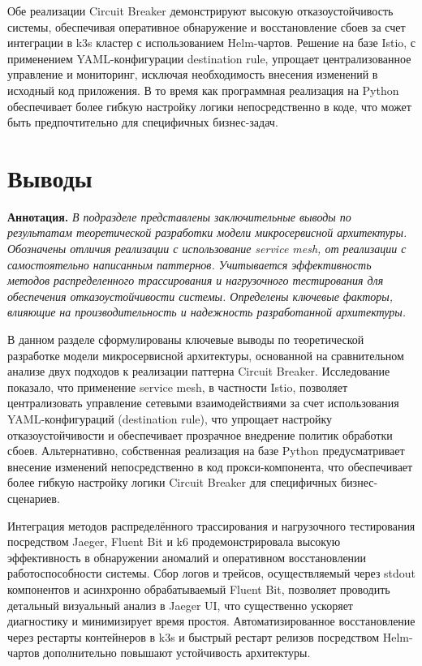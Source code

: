Обе реализации Circuit Breaker демонстрируют высокую отказоустойчивость системы, обеспечивая оперативное обнаружение и восстановление сбоев за счет интеграции в k3s кластер с использованием Helm-чартов. Решение на базе Istio, с применением YAML-конфигурации destination rule, упрощает централизованное управление и мониторинг, исключая необходимость внесения изменений в исходный код приложения. В то время как программная реализация на Python обеспечивает более гибкую настройку логики непосредственно в коде, что может быть предпочтительно для специфичных бизнес-задач.  

\section{Выводы}
  
\textbf{Аннотация.} \textit{В подразделе представлены заключительные выводы по результатам теоретической разработки модели микросервисной архитектуры. Обозначены отличия реализации с использование service mesh, от реализации с самостоятельно написанным паттернов. Учитывается эффективность методов распределенного трассирования и нагрузочного тестирования для обеспечения отказоустойчивости системы. Определены ключевые факторы, влияющие на производительность и надежность разработанной архитектуры.}

В данном разделе сформулированы ключевые выводы по теоретической разработке модели микросервисной архитектуры, основанной на сравнительном анализе двух подходов к реализации паттерна Circuit Breaker. Исследование показало, что применение service mesh, в частности Istio, позволяет централизовать управление сетевыми взаимодействиями за счет использования YAML-конфигураций (destination rule), что упрощает настройку отказоустойчивости и обеспечивает прозрачное внедрение политик обработки сбоев. Альтернативно, собственная реализация на базе Python предусматривает внесение изменений непосредственно в код прокси-компонента, что обеспечивает более гибкую настройку логики Circuit Breaker для специфичных бизнес-сценариев.

Интеграция методов распределённого трассирования и нагрузочного тестирования посредством Jaeger, Fluent Bit и k6 продемонстрировала высокую эффективность в обнаружении аномалий и оперативном восстановлении работоспособности системы. Сбор логов и трейсов, осуществляемый через stdout компонентов и асинхронно обрабатываемый Fluent Bit, позволяет проводить детальный визуальный анализ в Jaeger UI, что существенно ускоряет диагностику и минимизирует время простоя. Автоматизированное восстановление через рестарты контейнеров в k3s и быстрый рестарт релизов посредством Helm-чартов дополнительно повышают устойчивость архитектуры.


